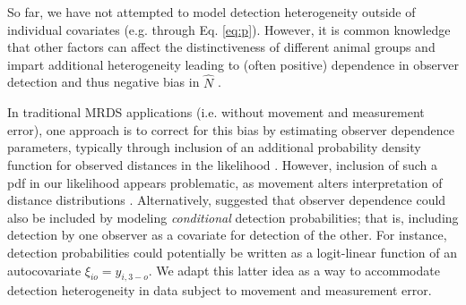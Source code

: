 \documentclass[12pt,fleqn]{article}
\begin{document}
So far, we have not attempted to model detection heterogeneity outside of individual covariates (e.g. through Eq. \ref{eq:p}).  However, it is common knowledge that other factors can affect the distinctiveness of different animal groups and impart additional heterogeneity leading to (often positive) dependence in observer detection and thus negative bias in $\hat{N}$ \citep{LaakeBorchers2004,BucklandEtAl2010,BurtEtAl2014}.

In traditional MRDS applications (i.e. without movement and measurement error), one approach is to correct for this bias by estimating observer dependence parameters, typically through inclusion of an additional probability density function for observed distances in the likelihood \citep[cf.][]{BucklandEtAl2010}.  However, inclusion of such a pdf in our likelihood appears problematic, as movement alters interpretation of distance distributions \citep{BurtEtAl2014}.  Alternatively, \citet{MacKenzieClement2016} suggested that observer dependence could also be included by modeling \textit{conditional} detection probabilities; that is, including detection by one observer as a covariate for detection of the other.  For instance, detection probabilities could potentially be written as a logit-linear function of an autocovariate $\xi_{io} = y_{i,3-o}$.  We adapt this latter idea as a way to accommodate detection heterogeneity in data subject to movement and measurement error.
\end{document}
